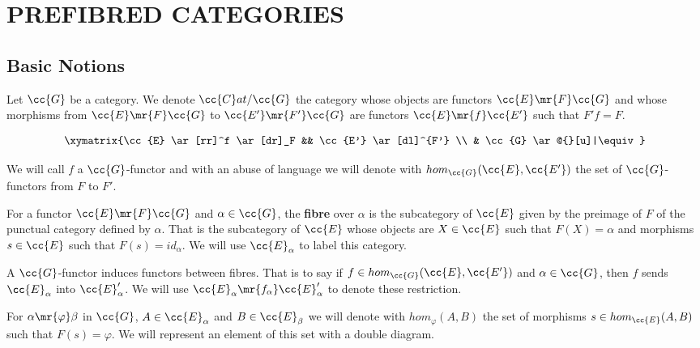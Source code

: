 


\section{PREFIBRED CATEGORIES}\label{fibrations}

\subsection{Basic Notions}
Let $\cc{G}$ be a category. We denote $\cc{C}at/{\cc{G}}$ the category whose objects are functors $\cc{E} \mr{F} \cc{G}$ and whose morphisms from ${\cc{E} \mr{F} \cc{G}}$ to $\cc{E'} \mr{F'} \cc{G}$ are  functors ${\cc{E} \mr{f} \cc{E'}}$ such that $F'f=F$.

\begin{align*}
\xymatrix{\cc{E} \ar[rr]^f \ar[dr]_F && \cc{E'} \ar[dl]^{F'} \\
		   & \cc{G} \ar@{}[u]|\equiv }
\end{align*}

\noindent We will call $f$ a $\cc{G}$-functor and with an abuse of language we will denote with $hom_{\cc{G}}(\cc{E},\cc{E'})$ the set of $\cc{G}$-functors from $F$ to $F'$. 
 
\begin{definition}%
For a functor $\cc{E} \mr{F} \cc{G}$ and $\alpha \in \cc{G}$, the \textbf{fibre} over $\alpha$ is the subcategory of $\cc{E}$ given by the preimage of $F$ of the punctual category defined by $\alpha$. That is the subcategory of $\cc{E}$ whose objects are  $X \in \cc{E}$ such that ${F(X)=\alpha}$ and morphisms  ${s \in \cc{E}}$ such that ${F(s)=id_\alpha}$. We will use $\cc{E}_\alpha$ to label this category.
\end{definition}

\begin{observation}
A $\cc{G}$-functor induces functors between fibres. That is to say if ${f \in hom_{\cc{G}}(\cc{E},\cc{E'})}$  and $\alpha \in \cc{G}$, then $f$ sends $\cc{E}_\alpha$ into $\cc{E}'_\alpha$. We will use $\cc{E}_\alpha \mr{f_\alpha} \cc{E}'_\alpha$ to denote these restriction.
\end{observation}

For $\alpha \mr{\varphi} \beta$ in $\cc{G}$, $A  \in \cc{E}_\alpha$ and $B  \in \cc{E}_\beta$ we will denote with $hom_\varphi(A,B)$ the set of morphisms $s \in hom_{\cc{E}}(A,B)$ such that $F(s)=\varphi$. We will represent an element of this set with a double diagram. 

